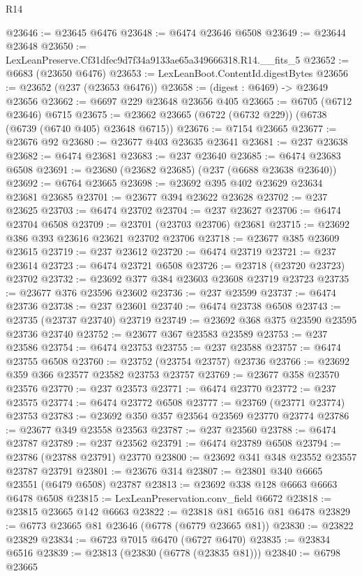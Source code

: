 \begin{lexlean}{R14}
\begin{coremodule}
@23646 := @23645 @6476
@23648 := @6474 @23646 @6508
@23649 := @23644 @23648
@23650 := LexLeanPreserve.Cf31dfec9d7f34a9133ae65a349666318.R14.__fits_5
@23652 := @6683 (@23650 @6476)
@23653 := LexLeanBoot.ContentId.digestBytes
@23656 := @23652 (@237 (@23653 @6476))
@23658 := (digest : @6469) -> @23649 @23656
@23662 := @6697 @229 @23648 @23656 @405
@23665 := @6705 (@6712 @23646) @6715
@23675 := @23662 @23665 (@6722 (@6732 @229)) (@6738 (@6739 (@6740 @405) @23648 @6715))
@23676 := @7154 @23665
@23677 := @23676 @92
@23680 := @23677 @403 @23635 @23641
@23681 := @237 @23638
@23682 := @6474 @23681
@23683 := @237 @23640
@23685 := @6474 @23683 @6508
@23691 := @23680 (@23682 @23685) (@237 (@6688 @23638 @23640))
@23692 := @6764 @23665
@23698 := @23692 @395 @402 @23629 @23634 @23681 @23685
@23701 := @23677 @394 @23622 @23628
@23702 := @237 @23625
@23703 := @6474 @23702
@23704 := @237 @23627
@23706 := @6474 @23704 @6508
@23709 := @23701 (@23703 @23706) @23681
@23715 := @23692 @386 @393 @23616 @23621 @23702 @23706
@23718 := @23677 @385 @23609 @23615
@23719 := @237 @23612
@23720 := @6474 @23719
@23721 := @237 @23614
@23723 := @6474 @23721 @6508
@23726 := @23718 (@23720 @23723) @23702
@23732 := @23692 @377 @384 @23603 @23608 @23719 @23723
@23735 := @23677 @376 @23596 @23602
@23736 := @237 @23599
@23737 := @6474 @23736
@23738 := @237 @23601
@23740 := @6474 @23738 @6508
@23743 := @23735 (@23737 @23740) @23719
@23749 := @23692 @368 @375 @23590 @23595 @23736 @23740
@23752 := @23677 @367 @23583 @23589
@23753 := @237 @23586
@23754 := @6474 @23753
@23755 := @237 @23588
@23757 := @6474 @23755 @6508
@23760 := @23752 (@23754 @23757) @23736
@23766 := @23692 @359 @366 @23577 @23582 @23753 @23757
@23769 := @23677 @358 @23570 @23576
@23770 := @237 @23573
@23771 := @6474 @23770
@23772 := @237 @23575
@23774 := @6474 @23772 @6508
@23777 := @23769 (@23771 @23774) @23753
@23783 := @23692 @350 @357 @23564 @23569 @23770 @23774
@23786 := @23677 @349 @23558 @23563
@23787 := @237 @23560
@23788 := @6474 @23787
@23789 := @237 @23562
@23791 := @6474 @23789 @6508
@23794 := @23786 (@23788 @23791) @23770
@23800 := @23692 @341 @348 @23552 @23557 @23787 @23791
@23801 := @23676 @314
@23807 := @23801 @340 @6665 @23551 (@6479 @6508) @23787
@23813 := @23692 @338 @128 @6663 @6663 @6478 @6508
@23815 := LexLeanPreservation.conv_field @6672
@23818 := @23815 @23665 @142 @6663
@23822 := @23818 @81 @6516 @81 @6478
@23829 := @6773 @23665 @81 @23646 (@6778 (@6779 @23665 @81))
@23830 := @23822 @23829
@23834 := @6723 @7015 @6470 (@6727 @6470)
@23835 := @23834 @6516
@23839 := @23813 (@23830 (@6778 (@23835 @81)))
@23840 := @6798 @23665

\end{coremodule}
\end{lexlean}
